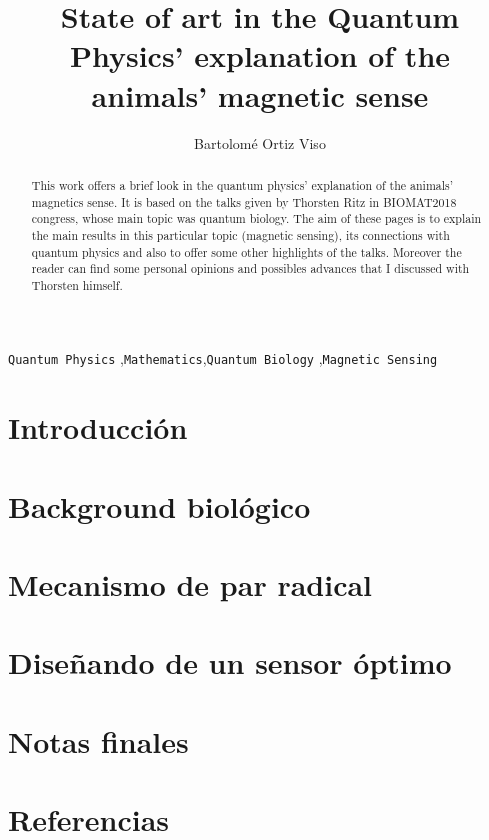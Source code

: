 \documentclass[1p]{elsarticle}
\begin{document}
\begin{frontmatter}

\title{State of art in the Quantum Physics' explanation of the animals' magnetic sense }

\author{Bartolomé Ortiz Viso}
\address{Master en Física y Matemáticas\\ Universidad de Granada\\23/06/2018}

\begin{abstract}
This work offers a brief look in the quantum physics' explanation of the animals' magnetics sense. It is based on the talks given by Thorsten Ritz in BIOMAT2018 congress, whose main topic was quantum biology. The aim of these pages is to explain the main results in this particular topic (magnetic sensing), its connections with quantum physics and also to offer some other highlights of the talks. Moreover the reader can find some personal opinions and possibles advances that I discussed with Thorsten himself. 
\end{abstract}

\begin{keyword}
 \texttt{Quantum Physics} \sep \texttt{Mathematics}\sep \texttt{Quantum Biology} \sep \texttt{Magnetic Sensing}
\end{keyword}

\end{frontmatter}
\setlength\parindent{0pt}
\linenumbers

\section{Introducción}


\section{Background biológico}



\section{Mecanismo de par radical}

\section{Diseñando de un sensor óptimo}



\section{Notas finales}


\section*{Referencias}


\begin{appendices}
	

\end{appendices}
\end{document}
